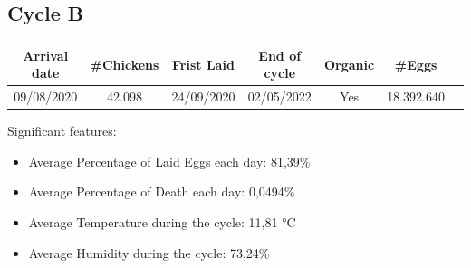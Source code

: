 \documentclass[11pt]{article}
\begin{document}
\subsection{Cycle B}
\begin{center}
    \begin{tabular}{| c | c | c | c | c | c | c |} 
        \hline
        Arrival date & \#Chickens & Frist Laid & End of cycle & Organic & \#Eggs\\ [0.5ex] 
        \hline
        09/08/2020 & 42.098 & 24/09/2020 & 02/05/2022 & Yes & 18.392.640\\ 
        \hline
    \end{tabular}
\end{center}

Significant features:
\begin{itemize}
    \item Average Percentage of Laid Eggs each day: 81,39\%
    \item Average Percentage of Death each day: 0,0494\%
    \item Average Temperature during the cycle: 11,81 °C
    \item Average Humidity during the cycle: 73,24\%
\end{itemize}
\end{document}
